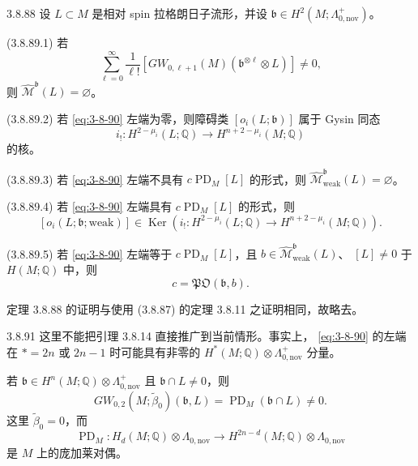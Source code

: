 \begin{theorem}{3.8.88}\label{thm:3-8-88}
设 $L\subset M$ 是相对 spin 拉格朗日子流形，并设
$\mathfrak b\in H^2(M;\Lambda^+_{0,\mathrm{nov}})$。

\smallskip
\noindent\textup{(3.8.89.1)}
若
\begin{equation}
 \sum_{\ell=0}^{\infty}\frac1{\ell!}
 \left[
 GW_{0,\ell+1}(M)
 (\mathfrak b^{\otimes\ell}\otimes L)
 \right]\ne0,
\tag{3.8.90}\label{eq:3-8-90}
\end{equation}
则 $\widehat{\mathcal M}^{\mathfrak b}(L)=\varnothing$。

\noindent\textup{(3.8.89.2)}
若 \eqref{eq:3-8-90} 左端为零，则障碍类
$[o_i(L;\mathfrak b)]$ 属于 Gysin 同态
\[
 i_!\colon H^{2-\mu_i}(L;\mathbb Q)
 \longrightarrow H^{n+2-\mu_i}(M;\mathbb Q)
\]
的核。

\noindent\textup{(3.8.89.3)}
若 \eqref{eq:3-8-90} 左端不具有
$c\operatorname{PD}_M[L]$ 的形式，则
$\widehat{\mathcal M}^{\mathfrak b}_{\mathrm{weak}}(L)=\varnothing$。

\noindent\textup{(3.8.89.4)}
若 \eqref{eq:3-8-90} 左端具有
$c\operatorname{PD}_M[L]$ 的形式，则
\[
 [o_i(L;\mathfrak b;\mathrm{weak})]
 \in\operatorname{Ker}\left(
 i_!\colon H^{2-\mu_i}(L;\mathbb Q)
 \longrightarrow H^{n+2-\mu_i}(M;\mathbb Q)
 \right).
\]

\noindent\textup{(3.8.89.5)}
若 \eqref{eq:3-8-90} 左端等于
$c\operatorname{PD}_M[L]$，且
$b\in\widehat{\mathcal M}^{\mathfrak b}_{\mathrm{weak}}(L)$、
$[L]\ne0$ 于 $H(M;\mathbb Q)$ 中，则
\[
 c=\mathfrak{PO}(\mathfrak b,b).
\]
\end{theorem}

定理 3.8.88 的证明与使用 (3.8.87) 的定理 3.8.11 之证明相同，故略去。

\begin{remark}{3.8.91}\label{rem:3-8-91}
这里不能把引理 3.8.14 直接推广到当前情形。事实上，
\eqref{eq:3-8-90} 的左端在 $*=2n$ 或 $2n-1$ 时可能具有非零的
$H^*(M;\mathbb Q)\otimes\Lambda^+_{0,\mathrm{nov}}$ 分量。

若
$\mathfrak b\in H^n(M;\mathbb Q)\otimes\Lambda^+_{0,\mathrm{nov}}$ 且
$\mathfrak b\cap L\ne0$，则
\[
 GW_{0,2}(M;\widetilde\beta_0)(\mathfrak b,L)
 =\operatorname{PD}_M(\mathfrak b\cap L)\ne0.
\]
这里 $\widetilde\beta_0=0$，而
\[
 \operatorname{PD}_M\colon
 H_d(M;\mathbb Q)\otimes\Lambda_{0,\mathrm{nov}}
 \longrightarrow
 H^{2n-d}(M;\mathbb Q)\otimes\Lambda_{0,\mathrm{nov}}
\]
是 $M$ 上的庞加莱对偶。
\end{remark}

